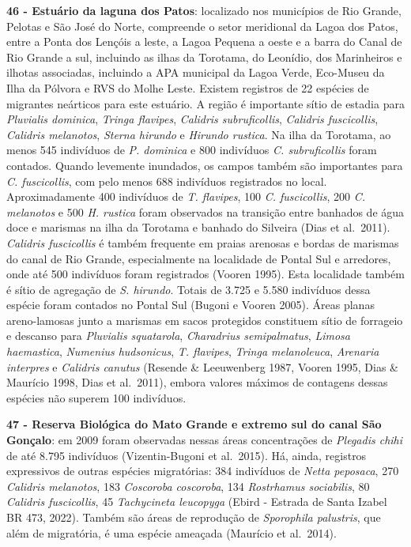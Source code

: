 \documentclass[
  oneside]{scrbook}
\begin{document}
\textbf{46 - Estuário da laguna dos Patos}: localizado nos municípios de Rio Grande, Pelotas e São José do Norte, compreende o setor meridional da Lagoa dos Patos, entre a Ponta dos Lençóis a leste, a Lagoa Pequena a oeste e a barra do Canal de Rio Grande a sul, incluindo as ilhas da Torotama, do Leonídio, dos Marinheiros e ilhotas associadas, incluindo a APA municipal da Lagoa Verde, Eco-Museu da Ilha da Pólvora e RVS do Molhe Leste. Existem registros de 22 espécies de migrantes neárticos para este estuário. A região é importante sítio de estadia para \emph{Pluvialis dominica}, \emph{Tringa flavipes}, \emph{Calidris subruficollis}, \emph{Calidris fuscicollis}, \emph{Calidris melanotos}, \emph{Sterna hirundo} e \emph{Hirundo rustica}. Na ilha da Torotama, ao menos 545 indivíduos de \emph{P. dominica} e 800 indivíduos \emph{C. subruficollis} foram contados. Quando levemente inundados, os campos também são importantes para \emph{C. fuscicollis}, com pelo menos 688 indivíduos registrados no local. Aproximadamente 400 indivíduos de \emph{T. flavipes}, 100 \emph{C. fuscicollis}, 200 \emph{C. melanotos} e 500 \emph{H. rustica} foram observados na transição entre banhados de água doce e marismas na ilha da Torotama e banhado do Silveira (Dias et al.~2011). \emph{Calidris fuscicollis} é também frequente em praias arenosas e bordas de marismas do canal de Rio Grande, especialmente na localidade de Pontal Sul e arredores, onde até 500 indivíduos foram registrados (Vooren 1995). Esta localidade também é sítio de agregação de \emph{S. hirundo}. Totais de 3.725 e 5.580 indivíduos dessa espécie foram contados no Pontal Sul (Bugoni e Vooren 2005). Áreas planas areno-lamosas junto a marismas em sacos protegidos constituem sítio de forrageio e descanso para \emph{Pluvialis squatarola}, \emph{Charadrius semipalmatus}, \emph{Limosa haemastica}, \emph{Numenius hudsonicus}, \emph{T. flavipes}, \emph{Tringa melanoleuca}, \emph{Arenaria interpres} e \emph{Calidris canutus} (Resende \& Leeuwenberg 1987, Vooren 1995, Dias \& Maurício 1998, Dias et al.~2011), embora valores máximos de contagens dessas espécies não superem 100 indivíduos.

\textbf{47 - Reserva Biológica do Mato Grande e extremo sul do canal São Gonçalo}: em 2009 foram observadas nessas áreas concentrações de \emph{Plegadis chihi} de até 8.795 indivíduos (Vizentin-Bugoni et al.~2015). Há, ainda, registros expressivos de outras espécies migratórias: 384 indivíduos de \emph{Netta peposaca}, 270 \emph{Calidris melanotos}, 183 \emph{Coscoroba coscoroba}, 134 \emph{Rostrhamus sociabilis}, 80 \emph{Calidris fuscicollis}, 45 \emph{Tachycineta leucopyga} (Ebird - Estrada de Santa Izabel BR 473, 2022). Também são áreas de reprodução de \emph{Sporophila palustris}, que além de migratória, é uma espécie ameaçada (Maurício et al.~2014).
\end{document}
